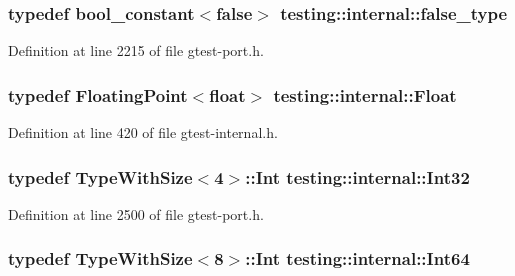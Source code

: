 \subsubsection[{\texorpdfstring{false\+\_\+type}{false_type}}]{\setlength{\rightskip}{0pt plus 5cm}typedef {\bf bool\+\_\+constant}$<$false$>$ {\bf testing\+::internal\+::false\+\_\+type}}\hypertarget{namespacetesting_1_1internal_abb1d0789f19bdde21affccbd1078b525}{}\label{namespacetesting_1_1internal_abb1d0789f19bdde21affccbd1078b525}


Definition at line 2215 of file gtest-\/port.\+h.

\subsubsection[{\texorpdfstring{Float}{Float}}]{\setlength{\rightskip}{0pt plus 5cm}typedef {\bf Floating\+Point}$<$float$>$ {\bf testing\+::internal\+::\+Float}}\hypertarget{namespacetesting_1_1internal_a02e1981f5ff70609e6ac06e006ff519a}{}\label{namespacetesting_1_1internal_a02e1981f5ff70609e6ac06e006ff519a}


Definition at line 420 of file gtest-\/internal.\+h.

\subsubsection[{\texorpdfstring{Int32}{Int32}}]{\setlength{\rightskip}{0pt plus 5cm}typedef {\bf Type\+With\+Size}$<$4$>$\+::Int {\bf testing\+::internal\+::\+Int32}}\hypertarget{namespacetesting_1_1internal_a8ee38faaf875f133358abaf9bc056cec}{}\label{namespacetesting_1_1internal_a8ee38faaf875f133358abaf9bc056cec}


Definition at line 2500 of file gtest-\/port.\+h.

\subsubsection[{\texorpdfstring{Int64}{Int64}}]{\setlength{\rightskip}{0pt plus 5cm}typedef {\bf Type\+With\+Size}$<$8$>$\+::Int {\bf testing\+::internal\+::\+Int64}}\hypertarget{namespacetesting_1_1internal_a271c563fec38b804ddab0677f51f70a8}{}\label{namespacetesting_1_1internal_a271c563fec38b804ddab0677f51f70a8}


